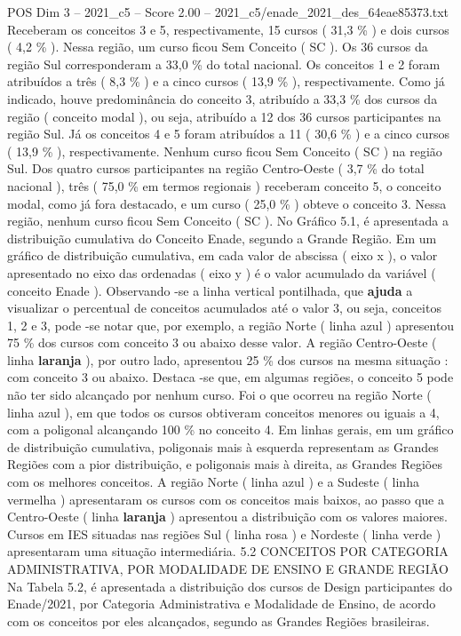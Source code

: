 \begin{textsample}{POS Dim 3 – 2021\_c5 – Score 2.00 – 2021\_c5/enade\_2021\_des\_64eae85373.txt}
Receberam os conceitos 3 e 5, respectivamente, 15 cursos ( 31,3 \% ) e dois cursos ( 4,2 \% ).
Nessa região, um curso ficou Sem Conceito ( SC ).
Os 36 cursos da região Sul corresponderam a 33,0 \% do total nacional.
Os conceitos 1 e 2 foram atribuídos a três ( 8,3 \% ) e a cinco cursos ( 13,9 \% ), respectivamente.
Como já indicado, houve predominância do conceito 3, atribuído a 33,3 \% dos cursos da região ( conceito modal ), ou seja, atribuído a 12 dos 36 cursos participantes na região Sul.
Já os conceitos 4 e 5 foram atribuídos a 11 ( 30,6 \% ) e a cinco cursos ( 13,9 \% ), respectivamente.
Nenhum curso ficou Sem Conceito ( SC ) na região Sul.
Dos quatro cursos participantes na região Centro-Oeste ( 3,7 \% do total nacional ), três ( 75,0 \% em termos regionais ) receberam conceito 5, o conceito modal, como já fora destacado, e um curso ( 25,0 \% ) obteve o conceito 3.
Nessa região, nenhum curso ficou Sem Conceito ( SC ).
No Gráfico 5.1, é apresentada a distribuição cumulativa do Conceito Enade, segundo a Grande Região.
Em um gráfico de distribuição cumulativa, em cada valor de abscissa ( eixo x ), o valor apresentado no eixo das ordenadas ( eixo y ) é o valor acumulado da variável ( conceito Enade ).
Observando -se a linha vertical pontilhada, que \textbf{ajuda} a visualizar o percentual de conceitos acumulados até o valor 3, ou seja, conceitos 1, 2 e 3, pode -se notar que, por exemplo, a região Norte ( linha azul ) apresentou 75 \% dos cursos com conceito 3 ou abaixo desse valor.
A região Centro-Oeste ( linha \textbf{laranja} ), por outro lado, apresentou 25 \% dos cursos na mesma situação : com conceito 3 ou abaixo.
Destaca -se que, em algumas regiões, o conceito 5 pode não ter sido alcançado por nenhum curso.
Foi o que ocorreu na região Norte ( linha azul ), em que todos os cursos obtiveram conceitos menores ou iguais a 4, com a poligonal alcançando 100 \% no conceito 4.
Em linhas gerais, em um gráfico de distribuição cumulativa, poligonais mais à esquerda representam as Grandes Regiões com a pior distribuição, e poligonais mais à direita, as Grandes Regiões com os melhores conceitos.
A região Norte ( linha azul ) e a Sudeste ( linha vermelha ) apresentaram os cursos com os conceitos mais baixos, ao passo que a Centro-Oeste ( linha \textbf{laranja} ) apresentou a distribuição com os valores maiores.
Cursos em IES situadas nas regiões Sul ( linha rosa ) e Nordeste ( linha verde ) apresentaram uma situação intermediária. 5.2 CONCEITOS POR CATEGORIA ADMINISTRATIVA, POR MODALIDADE DE ENSINO E GRANDE REGIÃO Na Tabela 5.2, é apresentada a distribuição dos cursos de Design participantes do Enade/2021, por Categoria Administrativa e Modalidade de Ensino, de acordo com os conceitos por eles alcançados, segundo as Grandes Regiões brasileiras.

\end{textsample}
